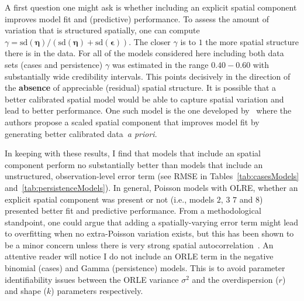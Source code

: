 A first question one might ask is whether including an explicit spatial component improves model fit and (predictive) performance.
To assess the amount of variation that is structured spatially, one can compute $\gamma = \text{sd}(\boldsymbol\eta)/\left(\text{sd}(\boldsymbol\eta)  +  \text{sd}(\boldsymbol\epsilon)\right)$.
The closer $\gamma$ is to $1$ the more spatial structure there is in the data.
For all of the models considered here including both data sets (cases and persistence) $\gamma$ was estimated in the range $0.40 - 0.60$ with substantially wide credibility intervals.
This points decisively in the direction of the \textbf{absence} of appreciable (residual) spatial structure.
It is possible that a better calibrated spatial model would be able to capture spatial variation and lead to better performance.
One such model is the one developed by~\cite{Riebler2016} where the authors propose a scaled spatial component that improves model fit by generating better calibrated data~\textit{a priori}.

In keeping with these results, I find that models that include an spatial component perform no substantially better than models that include an unstructured, observation-level error term (see RMSE in Tables~\ref{tab:casesModels} and~\ref{tab:persistenceModels}).
In general, Poisson models with OLRE, whether an explicit spatial component was present or not (i.e., models $2$, $3$ $7$ and $8$) presented better fit and predictive performance.
From a methodological standpoint, one could argue that adding a spatially-varying error term might lead to overfitting when no extra-Poisson variation exists, but this has been shown to be a minor concern unless there is very strong spatial autocorrelation~\citep{Latouche2007}.
An attentive reader will notice I do not include an ORLE term in the negative binomial (cases) and Gamma (persistence) models.
This is to avoid parameter identifiability issues between the ORLE variance $\sigma^2$ and the overdispersion ($r$) and shape ($k$) parameters respectively.

